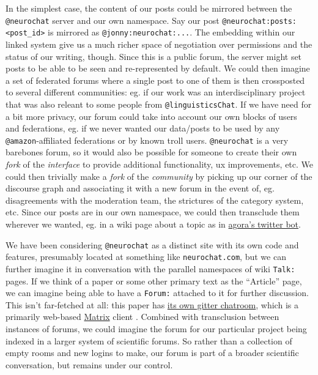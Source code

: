\documentclass[notoc]{tufte-book}
\begin{document}
In the simplest case, the content of our posts could be mirrored between
the \texttt{@neurochat} server and our own namespace. Say our post
\texttt{@neurochat:posts:\textless{}post\_id\textgreater{}} is mirrored
as \texttt{@jonny:neurochat:...}. The embedding within our linked system
give us a much richer space of negotiation over permissions and the
status of our writing, though. Since this is a public forum, the server
might set posts to be able to be seen and re-represented by default. We
could then imagine a set of federated forums where a single post to one
of them is then crossposted to several different communities: eg. if our
work was an interdisciplinary project that was also releant to some
people from \texttt{@linguisticsChat}. If we have need for a bit more
privacy, our forum could take into account our own blocks of users and
federations, eg. if we never wanted our data/posts to be used by any
\texttt{@amazon}-affiliated federations or by known troll users.
\texttt{@neurochat} is a very barebones forum, so it would also be
possible for someone to create their own \emph{fork} of the
\emph{interface} to provide additional functionality, ux improvements,
etc. We could then trivially make a \emph{fork} of the \emph{community}
by picking up our corner of the discourse graph and associating it with
a new forum in the event of, eg. disagreements with the moderation team,
the strictures of the category system, etc. Since our posts are in our
own namespace, we could then transclude them wherever we wanted, eg. in
a wiki page about a topic as in
\href{https://anagora.org/node/agora-bot}{agora's twitter bot}.

We have been considering \texttt{@neurochat} as a distinct site with its
own code and features, presumably located at something like
\texttt{neurochat.com}, but we can further imagine it in conversation
with the parallel namespaces of wiki \texttt{Talk:} pages. If we think
of a paper or some other primary text as the ``Article'' page, we can
imagine being able to have a \texttt{Forum:} attached to it for further
discussion. This isn't far-fetched at all: this paper has
\href{https://gitter.im/scientific-infrastructure/community}{its own
gitter chatroom}, which is a primarily web-based
\href{https://matrix.org/}{Matrix} client \citep{hodgsonGitterNowSpeaks2020, hodgsonWelcomingGitterMatrix2020} .
Combined with transclusion between instances of forums, we could imagine
the forum for our particular project being indexed in a larger system of
scientific forums. So rather than a collection of empty rooms and new
logins to make, our forum is part of a broader scientific conversation,
but remains under our control.
\end{document}
